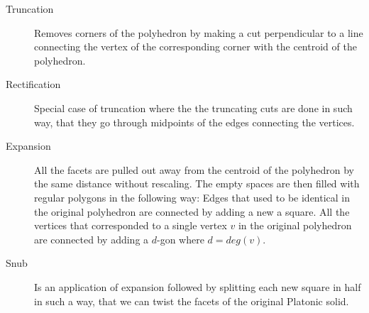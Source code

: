\begin{description}
    \item[Truncation] Removes corners of the polyhedron by making a cut perpendicular to a line connecting the vertex of the corresponding corner with the centroid of the polyhedron.
    \item[Rectification] Special case of truncation where the the truncating cuts are done in such way, that they go through midpoints of the edges connecting the vertices. 
    \item[Expansion] All the facets are pulled out away from the centroid of the polyhedron by the same distance without rescaling. The empty spaces are then filled with regular polygons in the following way: Edges that used to be identical in the original polyhedron are connected by adding a new a square. All the vertices that corresponded to a single vertex $v$ in the original polyhedron are connected by adding a $d$-gon where $d=deg(v)$.   
    \item[Snub] Is an application of expansion followed by splitting each new square in half in such a way, that we can twist the facets of the original Platonic solid.

\end{description}

